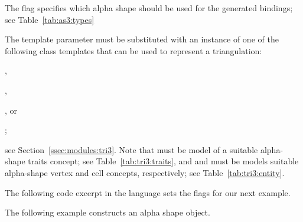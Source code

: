 The \cmake{} flag  specifies which alpha shape
should be used for the generated bindings; see
Table~\ref{tab:as3:types}

\begin{table}[!htp]
 \caption{\iiiDAlphaShapesPackage{} types}
  \centering{}
 \label{tab:as3:types}
\end{table}

The template parameter  must be substituted with an
instance of one of the following class templates that can be used to
represent a triangulation:
\begin{compactenum}
\item {},
\item {},
\item {}, or
\item {};
\end{compactenum}
see Section~\ref{ssec:modules:tri3}.
Note that  must be model of a suitable
alpha-shape traits concept; see Table~\ref{tab:tri3:traits}, and
 and  must be models
suitable alpha-shape vertex and cell concepts, respectively; see
Table~\ref{tab:tri3:entity}.

The following code excerpt in the \cmake{} language sets the \cmake{}
flags for our next example.

The following example constructs an alpha shape object.

